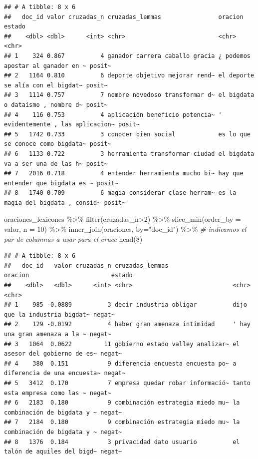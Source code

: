 \documentclass[
]{book}
\newenvironment{Shaded}{\begin{snugshade}}{\end{snugshade}}
\newcommand{\AttributeTok}[1]{\textcolor[rgb]{0.77,0.63,0.00}{#1}}
\newcommand{\CommentTok}[1]{\textcolor[rgb]{0.56,0.35,0.01}{\textit{#1}}}
\newcommand{\DecValTok}[1]{\textcolor[rgb]{0.00,0.00,0.81}{#1}}
\newcommand{\FunctionTok}[1]{\textcolor[rgb]{0.00,0.00,0.00}{#1}}
\newcommand{\NormalTok}[1]{#1}
\newcommand{\SpecialCharTok}[1]{\textcolor[rgb]{0.00,0.00,0.00}{#1}}
\newcommand{\StringTok}[1]{\textcolor[rgb]{0.31,0.60,0.02}{#1}}
\begin{document}
\begin{verbatim}
## # A tibble: 8 x 6
##   doc_id valor cruzadas_n cruzadas_lemmas                oracion                           estado
##    <dbl> <dbl>      <int> <chr>                          <chr>                             <chr> 
## 1    324 0.867          4 ganador carrera caballo gracia ¿ podemos apostar al ganador en ~ posit~
## 2   1164 0.810          6 deporte objetivo mejorar rend~ el deporte se alía con el bigdat~ posit~
## 3   1114 0.757          7 nombre novedoso transformar d~ el bigdata o dataísmo , nombre d~ posit~
## 4    116 0.753          4 aplicación beneficio potencia~ ' evidentemente , las aplicacion~ posit~
## 5   1742 0.733          3 conocer bien social            es lo que se conoce como bigdata~ posit~
## 6   1133 0.722          3 herramienta transformar ciudad el bigdata va a ser una de las h~ posit~
## 7   2016 0.718          4 entender herramienta mucho bi~ hay que entender que bigdata es ~ posit~
## 8   1740 0.709          6 magia considerar clase herram~ es la magia del bigdata , consid~ posit~
\end{verbatim}

\begin{Shaded}
\begin{Highlighting}[]
\NormalTok{oraciones\_lexicones }\SpecialCharTok{\%\textgreater{}\%}
  \FunctionTok{filter}\NormalTok{(cruzadas\_n}\SpecialCharTok{\textgreater{}}\DecValTok{2}\NormalTok{) }\SpecialCharTok{\%\textgreater{}\%}
  \FunctionTok{slice\_min}\NormalTok{(}\AttributeTok{order\_by =}\NormalTok{ valor, }\AttributeTok{n =} \DecValTok{10}\NormalTok{) }\SpecialCharTok{\%\textgreater{}\%}
  \FunctionTok{inner\_join}\NormalTok{(oraciones, }\AttributeTok{by=}\StringTok{"doc\_id"}\NormalTok{) }\SpecialCharTok{\%\textgreater{}\%} \CommentTok{\# indicamos el par de columnas a usar para el cruce}
  \FunctionTok{head}\NormalTok{(}\DecValTok{8}\NormalTok{)}
\end{Highlighting}
\end{Shaded}

\begin{verbatim}
## # A tibble: 8 x 6
##   doc_id   valor cruzadas_n cruzadas_lemmas                  oracion                       estado
##    <dbl>   <dbl>      <int> <chr>                            <chr>                         <chr> 
## 1    985 -0.0889          3 decir industria obligar          dijo que la industria bigdat~ negat~
## 2    129 -0.0192          4 haber gran amenaza intimidad     ' hay una gran amenaza a la ~ negat~
## 3   1064  0.0622         11 gobierno estado valley analizar~ el asesor del gobierno de es~ negat~
## 4    380  0.151           9 diferencia encuesta encuesta po~ a diferencia de una encuesta~ negat~
## 5   3412  0.170           7 empresa quedar robar informació~ tanto esta empresa como las ~ negat~
## 6   2183  0.180           9 combinación estrategia miedo mu~ la combinación de bigdata y ~ negat~
## 7   2184  0.180           9 combinación estrategia miedo mu~ la combinación de bigdata y ~ negat~
## 8   1376  0.184           3 privacidad dato usuario          el talón de aquiles del bigd~ negat~
\end{verbatim}
\end{document}
